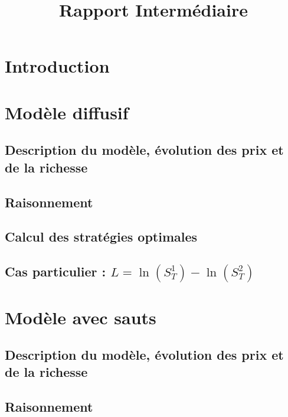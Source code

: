 \documentclass[11pt,letterpaper]{article}
\title{Rapport Intermédiaire}
\begin{document}



\pagebreak
\tableofcontents
\pagebreak

\section{Introduction}



\pagebreak
\section{Modèle diffusif}
%
\subsection{Description du modèle, évolution des prix et de la richesse}

\subsection{Raisonnement}

\subsection{Calcul des stratégies optimales}

\subsection{Cas particulier : $L = \ln \left( S_T^{1} \right) - \ln \left( S_T^{2} \right)$} \label{section_1_4}
 


\pagebreak
\section{Modèle avec sauts}
\subsection{Description du modèle, évolution des prix et de la richesse}

\subsection{Raisonnement}

\end{document}
